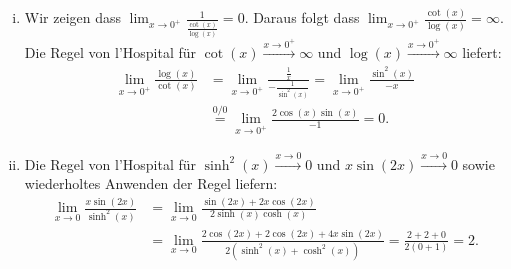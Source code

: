 \documentclass{theozettel}
\begin{document}
\begin{enumerate}[(i)]
	\item 	Wir zeigen dass $\lim_{x \to 0^{+}} \frac{1}{\frac{\cot(x)}{\log(x)}} = 0$. Daraus folgt dass $\lim_{x \to 0^{+}} \frac{\cot(x)}{\log(x)} = \infty$. Die Regel von l'Hospital für $\cot(x) \stackrel{x \to 0^{+}}{\longrightarrow} \infty$ und $\log(x)\stackrel{x \to 0^{+}}{\longrightarrow} \infty$ liefert:
			\begin{align*}
				\lim_{x \to 0^{+}} \frac{\log(x)}{\cot(x)} &= \lim_{x \to 0^{+}} \frac{\frac{1}{x}}{-\frac{1}{\sin^{2}(x)}}  = \lim_{x \to 0^{+}} \frac{\sin^{2}(x)}{-x} \\
				&\stackrel{0/0}{=} \lim_{x \to 0^{+}} \frac{2\cos(x)\sin(x)}{-1} = 0.
			\end{align*}
	
	\item 	Die Regel von l'Hospital für $\sinh^{2}(x)\stackrel{x \to 0}{\longrightarrow} 0$ und $ x\sin(2x) \stackrel{x \to 0}{\longrightarrow} 0$ sowie wiederholtes Anwenden der Regel liefern:
			\begin{align*}
				\lim_{x \to 0} \frac{x\sin(2x)}{\sinh^{2}(x)} &= \lim_{x \to 0} \frac{\sin(2x) + 2x\cos(2x)}{2\sinh(x)\cosh(x)} \\
				&= \lim_{x \to 0} \frac{2\cos(2x) + 2 \cos(2x) + 4x\sin(2x)}{2(\sinh^{2}(x) + \cosh^{2}(x))} = \frac{2+2+0}{2(0+1)} = 2.
			\end{align*}
\end{enumerate}
\end{document}
